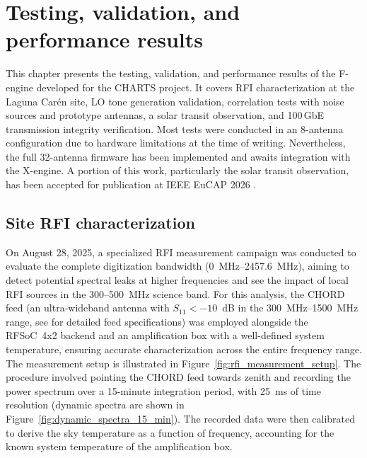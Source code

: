 \chapter{Testing, validation, and performance results}
\label{chap:results}
This chapter presents the testing, validation, and performance results of the F-engine developed for the CHARTS project. It covers RFI characterization at the Laguna Carén site, LO tone generation validation, correlation tests with noise sources and prototype antennas, a solar transit observation, and 100\,GbE transmission integrity verification. Most tests were conducted in an 8-antenna configuration due to hardware limitations at the time of writing. Nevertheless, the full 32-antenna firmware has been implemented and awaits integration with the X-engine. A portion of this work, particularly the solar transit observation, has been accepted for publication at IEEE EuCAP 2026 \citep{CHARTS_Antenna_FDM_2026}.


\section{Site RFI characterization}
\label{sec:rfi_measurements}
On August 28, 2025, a specialized RFI measurement campaign was conducted to evaluate the complete digitization bandwidth (\SI{0}{\mega\hertz}–\SI{2457.6}{\mega\hertz}), aiming to detect potential spectral leaks at higher frequencies and see the impact of local RFI sources in the 300--500~MHz science band. For this analysis, the CHORD feed (an ultra-wideband antenna with $S_{11} < -10$~dB in the \qtyrange{300}{1500}{\mega\hertz} range, see \citealt{MacKay_2023} for detailed feed specifications) was employed alongside the RFSoC~4x2 backend and an amplification box with a well-defined system temperature, ensuring accurate characterization across the entire frequency range. The measurement setup is illustrated in Figure~\ref{fig:rfi_measurement_setup}. The procedure involved pointing the CHORD feed towards zenith and recording the power spectrum over a 15-minute integration period, with 25~ms of time resolution (dynamic spectra are shown in Figure~\ref{fig:dynamic_spectra_15_min}). The recorded data were then calibrated to derive the sky temperature as a function of frequency, accounting for the known system temperature of the amplification box.

